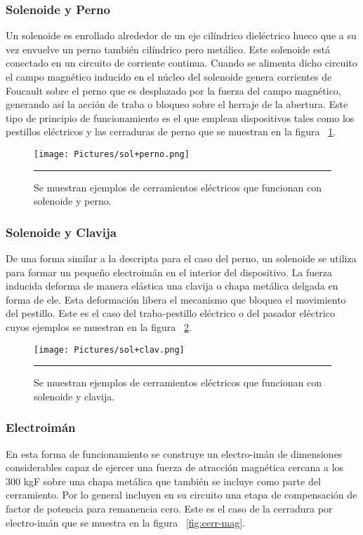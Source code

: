 \subsubsection{Solenoide y Perno}
Un solenoide es enrollado alrededor de un eje cilíndrico dieléctrico hueco que a su vez envuelve un perno también cilíndrico pero metálico. Este solenoide está conectado en un circuito de corriente continua. Cuando se alimenta dicho circuito el campo magnético inducido en el núcleo del solenoide genera corrientes de Foucault sobre el perno que es desplazado por la fuerza del campo magnético, generando así la acción de traba o bloqueo sobre el herraje de la abertura. 
Este tipo de principio de funcionamiento es el que emplean dispositivos tales como los pestillos eléctricos y las cerraduras de perno que se muestran en la figura ~\ref{fig:sol+perno}.

\begin{figure}[htbp]
	\centering
	\texttt{[image: Pictures/sol+perno.png]}
	\rule{35em}{1pt}
	\caption[Cerramientos de perno]{Se muestran ejemplos de cerramientos eléctricos que funcionan con solenoide y perno. }
	\label{fig:sol+perno}
\end{figure}

\subsubsection{Solenoide y Clavija}
De una forma similar a la descripta para el caso del perno, un solenoide se utiliza para formar un pequeño electroimán en el interior del dispositivo. La fuerza inducida deforma de manera elástica una clavija o chapa metálica delgada en forma de ele. Esta deformación libera el mecanismo que bloquea el movimiento del pestillo. Este es el caso del traba-pestillo eléctrico o del pasador eléctrico cuyos ejemplos se muestran en la figura ~\ref{fig:sol+clav}.

\begin{figure}[htbp]
	\centering
	\texttt{[image: Pictures/sol+clav.png]}
	\rule{35em}{1pt}
	\caption[Cerramientos de solenoide]{Se muestran ejemplos de cerramientos eléctricos que funcionan con solenoide y clavija. }
	\label{fig:sol+clav}
\end{figure}

\subsubsection{Electroimán}
En esta forma de funcionamiento se construye un electro-imán de dimensiones considerables capaz de ejercer una fuerza de atracción magnética cercana a los 300 kgF sobre una chapa metálica que también se incluye como parte del cerramiento. Por lo general incluyen en su circuito una etapa de compensación de factor de potencia para remanencia cero.
Este es el caso de la cerradura por electro-imán que se muestra en la figura ~\ref{fig:cerr-mag}.

